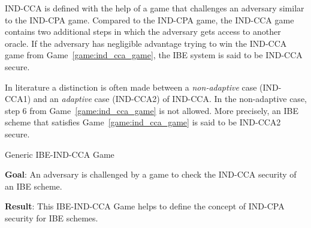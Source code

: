 IND-CCA is defined with the help of a game that challenges an adversary similar to the IND-CPA game. Compared to the IND-CPA game, the IND-CCA game contains two additional steps in which the adversary gets access to another oracle. If the adversary has negligible advantage trying to win the IND-CCA game from Game~\ref{game:ind_cca_game}, the IBE system is said to be IND-CCA secure.

In literature a distinction is often made between a \textit{non-adaptive} case (IND-CCA1) and an \textit{adaptive} case (IND-CCA2) of IND-CCA. In the non-adaptive case, step 6 from Game~\ref{game:ind_cca_game} is not allowed. More precisely, an IBE scheme that satisfies Game~\ref{game:ind_cca_game} is said to be IND-CCA2 secure.

\begin{game}
\caption{Generic IBE-IND-CCA Game~\cite{thesis:Alfredo08}}
\label{game:ind_cca_game}
\begin{description}
 \item \textbf{Goal}: An adversary is challenged by a game to check the IND-CCA security of an IBE scheme.
 
 \item \textbf{Result}: This IBE-IND-CCA Game helps to define the concept of IND-CPA security for IBE schemes.
\end{description}


\end{game}
